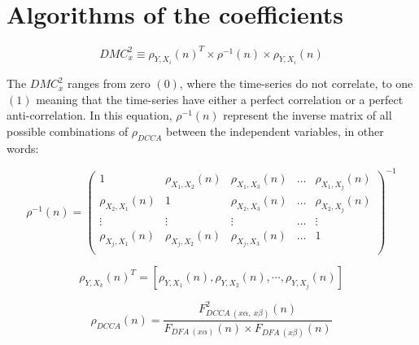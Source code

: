 \documentclass[article]{jss}
\begin{document}
\section{Algorithms of the coefficients}\label{sec:calculations}

\begin{equation}
  {DMC}_{x}^{2}  \equiv \rho_{Y,X_{i}}(n)^{T} \times \rho^{-1}(n) \times \rho_{Y,X_{i}}(n)
  \label{eq:dmcx2}
\end{equation}

The ${DMC}_{x}^{2}$ ranges from zero $(0)$, where the time-series do not correlate, to one $(1)$ meaning that the time-series have either a perfect correlation or a perfect anti-correlation. In this equation, $\rho^{-1}(n)$ represent the inverse matrix of all possible combinations of $\rho_{DCCA}$ between the independent variables, in other words:

\begin{equation}
  \rho^{-1}(n) = \left(\begin{matrix}
    1                     & \rho_{X_{1},X_{2}}(n) & \rho_{X_{1},X_{3}}(n) & \dots & \rho_{X_{1},X_{j}}(n) \\
    \rho_{X_{2},X_{1}}(n) & 1                     & \rho_{X_{2},X_{3}}(n) & \dots & \rho_{X_{2},X_{j}}(n) \\
    \vdots                & \vdots                & \vdots                & \dots & \vdots                \\
    \rho_{X_{j},X_{1}}(n) & \rho_{X_{j},X_{2}}(n) & \rho_{X_{j},X_{3}}(n) & \dots & 1                     \\
  \end{matrix}\right)^{-1}
  \label{eq:p_dcca_matrix}
\end{equation}


\begin{equation}
  \rho_{Y,X_k}(n)^T=[\rho_{Y,X_1}(n), \rho_{Y,X_2}(n),\cdots,\rho_{Y,X_j}(n)]
  \label{eq:rhocol}
\end{equation}

\begin{equation}
  {\rho}_{DCCA}(n) = \frac{F_{DCCA~(x\alpha,~x\beta)}^{2}(n)}
  {F_{DFA~(x\alpha)}(n) \times F_{DFA~(x\beta)}(n)}
  \label{eq:p_dcca}
\end{equation}
\end{document}
